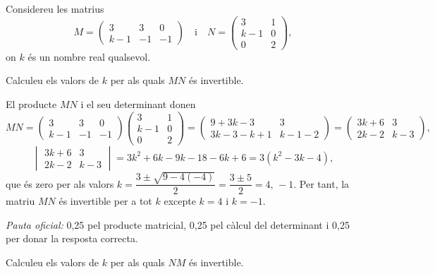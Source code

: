 Considereu les matrius
\[
M=\begin{pmatrix}3&3&0\\k-1&-1&-1\end{pmatrix}\quad\text{i}\quad
N=\begin{pmatrix}3&1\\k-1&0\\0&2\end{pmatrix},
\]
on $k$ és un nombre real qualsevol.

\begin{apartats}

Calculeu els valors de $k$ per als quals $MN$ és invertible.

\begin{solucio}
El producte $MN$ i el seu determinant donen
\[
MN=\begin{pmatrix}3&3&0\\k-1&-1&-1\end{pmatrix}\begin{pmatrix}3&1\\k-1&0\\0&2\end{pmatrix}
=\begin{pmatrix}9+3k-3&3\\3k-3-k+1&k-1-2\end{pmatrix}=\begin{pmatrix}3k+6&3\\2k-2&k-3\end{pmatrix},
\]
\[
\begin{vmatrix}3k+6&3\\2k-2&k-3\end{vmatrix}=3k^2+6k-9k-18-6k+6=3\left(k^2-3k-4\right),
\]
que és zero per als valors $k=\dfrac{3\pm\sqrt{9-4(-4)}}{2}=\dfrac{3\pm5}{2}=4,\,-1$. Per tant, la matriu $MN$
és invertible per a tot $k$ excepte $k=4$ i $k=-1$.

\textit{Pauta oficial:} 0,25 pel producte matricial, 0,25 pel càlcul del determinant i 0,25 per donar la
resposta correcta.
\end{solucio}

Calculeu els valors de $k$ per als quals $NM$ és invertible.


\end{apartats}
